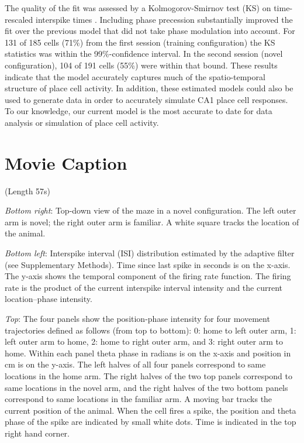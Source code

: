 \documentclass[preprint,rmp,preprintnumbers,floatfix]{revtex4}
\begin{document}
The quality of the fit was assessed by a Kolmogorov-Smirnov test (KS) on
time-rescaled interspike times \cite{Brown2002,Frank2002}.
Including phase precession substantially improved the fit over the previous
model that did not take phase modulation into account. For 131 of 185 cells
(71\%) from the first session (training configuration) the KS statistics was
within the 99\%-confidence interval. In the second session (novel configuration),
104 of 191 cells (55\%) were within that bound. These results indicate that the
model accurately captures much of the spatio-temporal structure of place cell
activity.  In addition, these estimated models could also be used to generate
data in order to accurately simulate CA1 place cell responses.  To our
knowledge, our current model is the most accurate to date for data analysis or
simulation of place cell activity.

\begin{widetext}
\end{widetext}
\mbox{}

\clearpage
\section*{\large Movie Caption}

  (Length 57s)

{\it Bottom right}: Top-down view of the maze in a novel
configuration. The left outer arm is novel; the right outer arm is familiar. A
white square tracks the location of the animal.  

{\it Bottom left}: Interspike interval (ISI) distribution estimated by the
adaptive filter (see Supplementary Methods). Time since last spike in seconds is
on the x-axis. The y-axis shows the temporal component of the firing rate
function.  The firing rate is the product of the current interspike interval
intensity and the current location--phase intensity.

{\it Top}: The four panels show the position-phase intensity for four movement
trajectories defined as follows (from top to bottom): 0: home to left outer arm,
1: left outer arm to home, 2: home to right outer arm, and 3: right outer arm to
home. Within each panel theta phase in radians is on the x-axis and position in
cm is on the y-axis.  The left halves of all four panels correspond to same
locations in the home arm. The right halves of the two top panels correspond to
same locations in the novel arm, and the right halves of the two bottom panels
correspond to same locations in the familiar arm.  A moving bar tracks the
current position of the animal. When the cell fires a spike, the position and
theta phase of the spike are indicated by small white dots. Time is indicated in
the top right hand corner. 
\\
\end{document}
